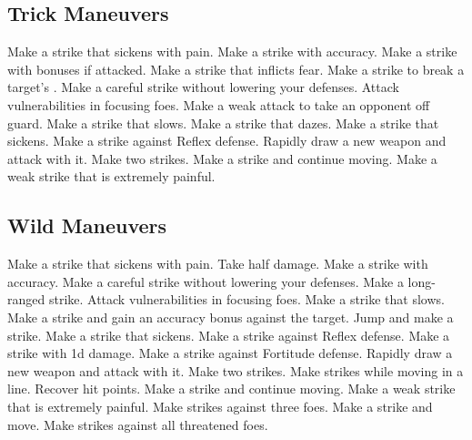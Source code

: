 \subsection{Trick Maneuvers}\label{Trick Maneuvers}
\begin{spelllist}
 Make a strike that sickens with pain.
 Make a strike with  accuracy.
 Make a strike with bonuses if attacked.
 Make a strike that inflicts fear.
 Make a strike to break a target's .
 Make a careful strike without lowering your defenses.
 Attack vulnerabilities in focusing foes.
 Make a weak attack to take an opponent off guard.
 Make a strike that slows.
 Make a strike that dazes.
 Make a strike that sickens.
 Make a strike against Reflex defense.
 Rapidly draw a new weapon and attack with it.
 Make two strikes.
 Make a strike and continue moving.
 Make a weak strike that is extremely painful.
\end{spelllist}



\small
\subsection{Wild Maneuvers}\label{Wild Maneuvers}
\begin{spelllist}
 Make a strike that sickens with pain.
 Take half damage.
 Make a strike with  accuracy.
 Make a careful strike without lowering your defenses.
 Make a long-ranged strike.
 Attack vulnerabilities in focusing foes.
 Make a strike that slows.
 Make a strike and gain an accuracy bonus against the target.
 Jump and make a strike.
 Make a strike that sickens.
 Make a strike against Reflex defense.
 Make a strike with \plus1d damage.
 Make a strike against Fortitude defense.
 Rapidly draw a new weapon and attack with it.
 Make two strikes.
 Make strikes while moving in a line.
 Recover hit points.
 Make a strike and continue moving.
 Make a weak strike that is extremely painful.
 Make strikes against three foes.
 Make a strike and move.
 Make strikes against all threatened foes.
\end{spelllist}
